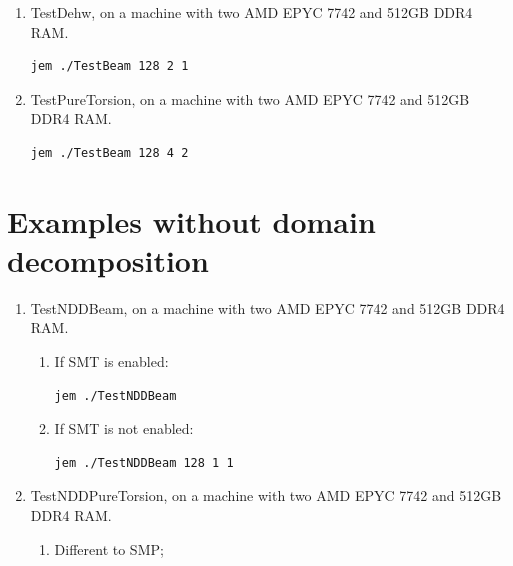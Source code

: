 \begin{enumerate}[label=$\blacksquare$]
\begin{lstlisting}[breaklines=true]
jem ./TestBeam 128 2 1
\end{lstlisting}
\item TestDehw, on a machine with two AMD EPYC 7742 and 512GB DDR4 RAM.
\begin{lstlisting}[breaklines=true]
jem ./TestBeam 128 2 1
\end{lstlisting}
\item TestPureTorsion, on a machine with two AMD EPYC 7742 and 512GB DDR4 RAM.
\begin{lstlisting}[breaklines=true]
jem ./TestBeam 128 4 2
\end{lstlisting}
\end{enumerate}

\section{Examples without domain decomposition}

\begin{enumerate}[label=$\blacksquare$]
\item TestNDDBeam, on a machine with two AMD EPYC 7742 and 512GB DDR4 RAM.
  \begin{enumerate}[label=$\bullet$]
  \item If SMT is enabled:
\begin{lstlisting}[breaklines=true]
jem ./TestNDDBeam
\end{lstlisting}
  \item If SMT is not enabled:
\begin{lstlisting}[breaklines=true]
jem ./TestNDDBeam 128 1 1
\end{lstlisting}
  \end{enumerate}
\item TestNDDPureTorsion, on a machine with two AMD EPYC 7742 and 512GB DDR4 RAM.
  \begin{enumerate}[label=$\bullet$]
  \item Different to SMP;
  \end{enumerate}
\end{enumerate}
